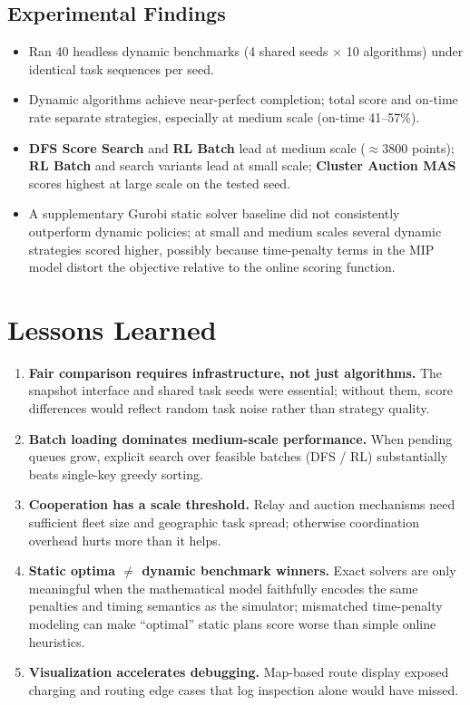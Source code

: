 \subsection{Experimental Findings}

\begin{itemize}[leftmargin=4em]
    \item Ran 40 headless dynamic benchmarks (4 shared seeds $\times$ 10 algorithms) under identical task sequences per seed.
    \item Dynamic algorithms achieve near-perfect completion; total score and on-time rate separate strategies, especially at medium scale (on-time 41--57\%).
    \item \textbf{DFS Score Search} and \textbf{RL Batch} lead at medium scale ($\approx$3800 points); \textbf{RL Batch} and search variants lead at small scale; \textbf{Cluster Auction MAS} scores highest at large scale on the tested seed.
    \item A supplementary Gurobi static solver baseline did not consistently outperform dynamic policies; at small and medium scales several dynamic strategies scored higher, possibly because time-penalty terms in the MIP model distort the objective relative to the online scoring function.
\end{itemize}

\section{Lessons Learned}

\begin{enumerate}[leftmargin=4em]
    \item \textbf{Fair comparison requires infrastructure, not just algorithms.} The snapshot interface and shared task seeds were essential; without them, score differences would reflect random task noise rather than strategy quality.
    \item \textbf{Batch loading dominates medium-scale performance.} When pending queues grow, explicit search over feasible batches (DFS / RL) substantially beats single-key greedy sorting.
    \item \textbf{Cooperation has a scale threshold.} Relay and auction mechanisms need sufficient fleet size and geographic task spread; otherwise coordination overhead hurts more than it helps.
    \item \textbf{Static optima $\neq$ dynamic benchmark winners.} Exact solvers are only meaningful when the mathematical model faithfully encodes the same penalties and timing semantics as the simulator; mismatched time-penalty modeling can make ``optimal'' static plans score worse than simple online heuristics.
    \item \textbf{Visualization accelerates debugging.} Map-based route display exposed charging and routing edge cases that log inspection alone would have missed.
\end{enumerate}

